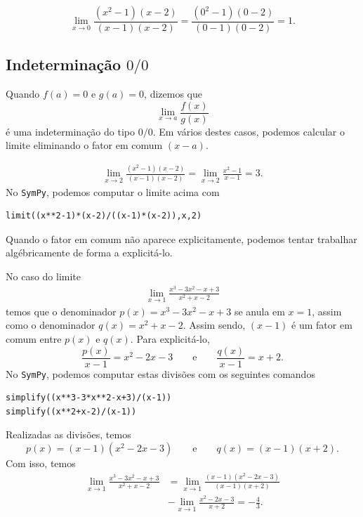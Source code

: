 \begin{ex}
  \begin{equation}
    \lim_{x\to 0} \frac{(x^2-1)(x-2)}{(x-1)(x-2)} = \frac{(0^2-1)(0-2)}{(0-1)(0-2)} = 1.
  \end{equation}
\end{ex}

\subsection{Indeterminação $0/0$}

Quando $f(a)=0$ e $g(a)=0$, dizemos que
\begin{equation}
  \lim_{x\to a} \frac{f(x)}{g(x)}
\end{equation}
é uma indeterminação do tipo $0/0$. Em vários destes casos, podemos calcular o limite eliminando o fator em comum $(x-a)$.

\begin{ex}
  \begin{align}
    \lim_{x\to 2}\frac{(x^2-1)(x-2)}{(x-1)(x-2)} = \lim_{x\to 2} \frac{x^2-1}{x-1} = 3.
  \end{align}
  \ifispython
  No \verb+SymPy+, podemos computar o limite acima com
\begin{verbatim}
limit((x**2-1)*(x-2)/((x-1)*(x-2)),x,2)
\end{verbatim}
  \fi
\end{ex}

Quando o fator em comum não aparece explicitamente, podemos tentar trabalhar algébricamente de forma a explicitá-lo.

\begin{ex}
  No caso do limite
  \begin{align}
    \lim_{x\to 1} \frac{x^3-3x^2-x+3}{x^2+x-2}
  \end{align}
  temos que o denominador $p(x) = x^3-3x^2-x+3$ se anula em $x=1$, assim como o denominador $q(x) = x^2+x-2$. Assim sendo, $(x-1)$ é um fator em comum entre $p(x)$ e $q(x)$. Para explicitá-lo, 
  \begin{equation}
    \frac{p(x)}{x-1} = x^2-2x-3\qquad\text{e}\qquad\frac{q(x)}{x-1} = x+2.
  \end{equation}
  \ifispython
  No \verb+SymPy+, podemos computar estas divisões com os seguintes comandos
\begin{verbatim}
simplify((x**3-3*x**2-x+3)/(x-1))
simplify((x**2+x-2)/(x-1))
\end{verbatim}
  \fi
  Realizadas as divisões, temos
  \begin{equation}
    p(x) = (x-1)(x^2-2x-3)\qquad\text{e}\qquad q(x)=(x-1)(x+2).
  \end{equation}
  Com isso, temos
  \begin{align}
    \lim_{x\to 1} \frac{x^3-3x^2-x+3}{x^2+x-2} &= \lim_{x\to 1} \frac{(x-1)(x^2-2x-3)}{(x-1)(x+2)} \\
    &- \lim_{x\to 1} \frac{x^2-2x-3}{x+2} = -\frac{4}{3}.
  \end{align}
\end{ex}

